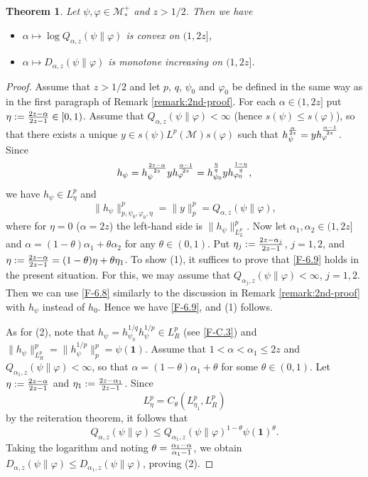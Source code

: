 \documentclass[12pt]{article}
\newtheorem{theorem}{Theorem}[section]
\theoremstyle{definition}
\theoremstyle{remark}
\numberwithin{equation}{section}
\def\Me{\mathcal M}
\def\ffi{\varphi}
\def\1{\mathbf{1}}
\begin{document}
\begin{theorem}\label{T-6.6}
Let $\psi,\ffi\in\Me_*^+$ and $z>1/2$. Then we have
\begin{itemize}
\item[(1)] $\alpha\mapsto\log Q_{\alpha,z}(\psi\|\ffi)$ is convex on $(1,2z]$,
\item[(2)] $\alpha\mapsto D_{\alpha,z}(\psi\|\ffi)$ is monotone increasing on $(1,2z]$.
\end{itemize}
\end{theorem}

\begin{proof}
Assume that $z>1/2$ and 
let $p$, $q$, $\psi_0$ and $\ffi_0$ be defined in the same way as in the first paragraph of
Remark \ref{remark:2nd-proof}. For each $\alpha\in(1,2z]$ put $\eta:={2z-\alpha\over2z-1}\in[0,1)$.
Assume that $Q_{\alpha,z}(\psi\|\ffi)<\infty$ (hence $s(\psi)\le s(\ffi)$), so that there exists a unique
$y\in s(\psi)L^p(\Me)s(\ffi)$ such that $h_\psi^{\alpha\over2z}=yh_\ffi^{\alpha-1\over2z}$. Since
\[
h_\psi=h_\psi^{2z-\alpha\over2z}yh_\ffi^{\alpha-1\over2z}
=h_{\psi_0}^{\eta\over q}yh_{\ffi_0}^{1-\eta\over q},
\]
we have $h_\psi\in L^p_\eta$ and
\[
\|h_\psi\|_{p,\psi_0,\ffi_0,\eta}^p=\|y\|_p^p=Q_{\alpha,z}(\psi\|\ffi),
\]
where for $\eta=0$ ($\alpha=2z$) the left-hand side is $\|h_\psi\|_{L^p_L}^p$. Now let
$\alpha_1,\alpha_2\in(1,2z]$ and $\alpha=(1-\theta)\alpha_1+\theta\alpha_2$ for any $\theta\in(0,1)$.
Put $\eta_j:={2z-\alpha_j\over2z-1}$, $j=1,2$, and
$\eta:={2z-\alpha\over2z-1}=(1-\theta)\eta+\theta\eta_1$. To show (1), it suffices to prove that
\eqref{F-6.9} holds in the present situation. For this, we may assume that
$Q_{\alpha_j,z}(\psi\|\ffi)<\infty$, $j=1,2$. Then we can use \eqref{F-6.8} similarly to the discussion
in Remark \ref{remark:2nd-proof} with $h_\psi$ instead of $h_0$. Hence we have \eqref{F-6.9},
and (1) follows.

As for (2), note that $h_\psi=h_{\psi_0}^{1/q}h_\psi^{1/p}\in L^p_R$ (see \eqref{F-C.3}) and
$\|h_\psi\|_{L^p_R}^p=\|h_\psi^{1/p}\|_p^p=\psi(\1)$. Assume that $1<\alpha<\alpha_1\le2z$ and
$Q_{\alpha_1,z}(\psi\|\ffi)<\infty$, so that $\alpha=(1-\theta)\alpha_1+\theta$ for some $\theta\in(0,1)$.
Let $\eta:={2z-\alpha\over2z-1}$ and $\eta_1:={2z-\alpha_1\over2z-1}$. Since
\[
L^p_\eta=C_\theta(L^p_{\eta_1},L^p_R)
\]
by the reiteration theorem, it follows that
\[
Q_{\alpha,z}(\psi\|\ffi)\le Q_{\alpha_1,z}(\psi\|\ffi)^{1-\theta}\psi(\1)^\theta.
\]
Taking the logarithm and noting $\theta={\alpha_1-\alpha\over\alpha_1-1}$, we obtain
$D_{\alpha,z}(\psi\|\ffi)\le D_{\alpha_1,z}(\psi\|\ffi)$, proving (2).
\end{proof}
\end{document}
